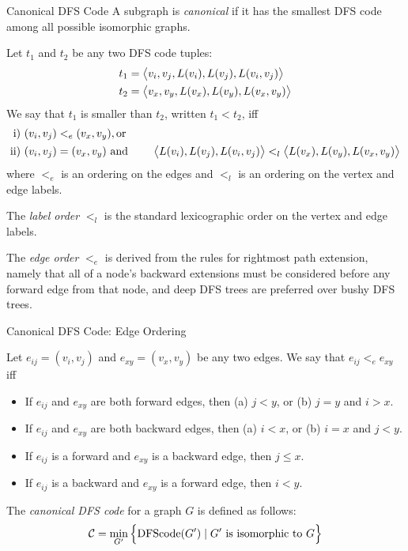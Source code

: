 \begin{frame}{Canonical DFS Code}
  \small
A subgraph is {\em canonical}
if it has the smallest
DFS code among all possible isomorphic graphs.

\medskip
Let $t_1$ and $t_2$ be any two DFS code tuples:
\begin{align*}
t_1 &= {\big\langle v_i, v_{j}, L(v_i), L(v_{j}), L(v_i,v_{j}) \big\rangle}\\
t_2 &={\big\langle v_x, v_y, L(v_x), L(v_y), L(v_x,v_y) \big\rangle}
\end{align*}
We say that $t_1$ is smaller than $t_2$, written $t_1 < t_2$, iff
\begin{align*}
    \text{i) }& (v_i,v_{j}) <_e (v_x,v_y), \text{or}\\
    \text{ii) }&  (v_i,v_{j}) = (v_x,v_y) \text{ and }
      \qquad {\big\langle L(v_i), L(v_{j}), L(v_i,v_{j}) \big\rangle}
    <_l {\big\langle L(v_x), L(v_y), L(v_x,v_y) \big\rangle}
\end{align*}
where $<_e$ is an ordering on the edges and $<_l$ is an ordering on the
vertex and edge labels. 

\medskip
The {\em label order} $<_l$ is the standard
lexicographic order on the vertex and edge labels.

\medskip
The {\em edge order} $<_e$ is derived from
the rules for rightmost path extension, namely that all of a node's
backward extensions must be considered before any forward edge from
that node, and deep DFS trees are preferred over bushy DFS trees.

\end{frame}

\begin{frame}{Canonical DFS Code: Edge Ordering}

Let $e_{ij} = (v_i,v_{j})$ and $e_{xy} = (v_x,v_y)$ be
any two edges. We say that $e_{ij} <_e e_{xy}$ iff
\begin{itemize}
  \item If $e_{ij}$ and $e_{xy}$ are both forward edges, then (a) $j < y$, or (b) $j=y$ and $i > x$. 
	
  \item If $e_{ij}$ and $e_{xy}$ are both backward edges, then (a) $i<x$, or
  (b) $i=x$ and $j < y$. 

\item If $e_{ij}$ is a forward and $e_{xy}$ is a backward edge, then $j
  \le x$. 

\item If $e_{ij}$ is a backward and $e_{xy}$ is a forward edge, then $i < y$.
\end{itemize}

\bigskip
The {\em canonical DFS code}
for a graph $G$ is def\/{i}ned as follows:
\begin{align*}
  {\mathcal C} = \min_{G'} \Big\{\text{DFScode}(G') \mid G' \text{ is isomorphic to } G\Big\}
\end{align*}
\end{frame}


